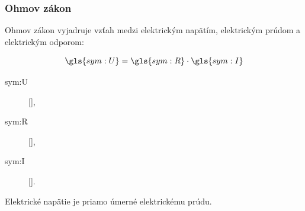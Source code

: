 \begin{frame}
	\frametitle{Ohmov zákon}
	
	Ohmov zákon vyjadruje vzťah medzi elektrickým napätím, elektrickým prúdom a elektrickým odporom:
	
	\[
		\gls{sym:U} = \gls{sym:R} \cdot \gls{sym:I}
	\]
	
	\vspace{4mm}
	
	\begin{description}
		\item[\gls{sym:U}]  [],
		\item[\gls{sym:R}]  [],
		\item[\gls{sym:I}]  [].
	\end{description}
	
	Elektrické napätie je priamo úmerné elektrickému prúdu.
	
\end{frame}
